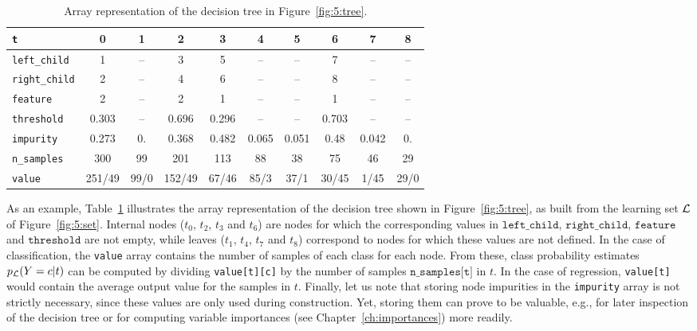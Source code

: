 \begin{table}
    \small
    \hspace{-1.3cm}
    \begin{tabular}{| l | c c c c c c c c c |}
    \hline
    \texttt{t}    & 0 & 1 & 2 & 3 & 4 & 5 & 6 & 7 & 8 \\
    \hline
    \hline
    \texttt{left\_child} & 1 & -- & 3 & 5 & -- & -- & 7 & -- & -- \\
    \texttt{right\_child} & 2 & -- & 4 & 6 & -- & -- & 8 & -- & -- \\
    \texttt{feature} & 2 & -- & 2 & 1 & -- & -- & 1 & -- & -- \\
    \texttt{threshold} & 0.303 & -- & 0.696 & 0.296 & -- & -- & 0.703 & -- & -- \\
    \texttt{impurity} & 0.273 & 0. & 0.368 & 0.482 &  0.065 &  0.051 & 0.48  & 0.042 &  0. \\
    \texttt{n\_samples} & 300 & 99  & 201 & 113  & 88  & 38  & 75  & 46  & 29\\
    \texttt{value} & 251/49 & 99/0 & 152/49 & 67/46 & 85/3 & 37/1 & 30/45 & 1/45 & 29/0 \\
    \hline
    \end{tabular}
    \caption{Array representation of the decision tree in Figure~\ref{fig:5:tree}.}
    \label{table:tree-array}
\end{table}

As an example, Table~\ref{table:tree-array} illustrates the array
representation of the decision tree shown in Figure~\ref{fig:5:tree}, as built
from the learning set ${\cal L}$ of Figure~\ref{fig:5:set}. Internal nodes
($t_0$, $t_2$, $t_3$ and $t_6$) are nodes for which the corresponding values in
$\texttt{left\_child}$, $\texttt{right\_child}$, $\texttt{feature}$ and
$\texttt{threshold}$ are not empty, while leaves ($t_1$, $t_4$, $t_7$ and
$t_8$) correspond to nodes for which these values are not defined. In the case
of classification, the \texttt{value} array contains the number of samples of
each class for each node. From these, class probability estimates $p_{\cal
L}(Y=c|t)$ can be computed by dividing \texttt{value[t][c]} by the number of
samples $\texttt{n\_samples[t]}$ in $t$. In the case of regression,
\texttt{value[t]} would  contain the average output value for the samples in
$t$. Finally, let us note that storing node impurities in the \texttt{impurity}
array is not strictly necessary, since these values are only used during
construction. Yet, storing them can prove to be valuable, e.g., for
later inspection of the decision tree or for computing variable importances (see
Chapter~\ref{ch:importances}) more readily.

